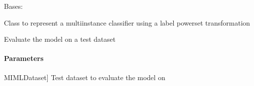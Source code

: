 \documentclass[letterpaper,10pt,english]{sphinxmanual}
\begin{document}
\begin{fulllineitems}
\label{\detokenize{classifier/mimlTOmi/_autosummary/miml.classifier.mimlTOmi.miml_to_mi_lp_classifier.MIMLtoMILPClassifier:miml.classifier.mimlTOmi.miml_to_mi_lp_classifier.MIMLtoMILPClassifier}}
\pysigstartsignatures
{}
\pysigstopsignatures
\sphinxAtStartPar
Bases: {\hyperref[\detokenize{classifier/mimlTOmi/_autosummary/miml.classifier.mimlTOmi.miml_to_mi_classifier.MIMLtoMIClassifier:miml.classifier.mimlTOmi.miml_to_mi_classifier.MIMLtoMIClassifier}]{}}

\sphinxAtStartPar
Class to represent a multi\sphinxhyphen{}instance classifier using a label powerset transformation

\begin{fulllineitems}
\label{\detokenize{classifier/mimlTOmi/_autosummary/miml.classifier.mimlTOmi.miml_to_mi_lp_classifier.MIMLtoMILPClassifier:miml.classifier.mimlTOmi.miml_to_mi_lp_classifier.MIMLtoMILPClassifier.evaluate}}
\pysigstartsignatures
{}
\pysigstopsignatures
\sphinxAtStartPar
Evaluate the model on a test dataset


\paragraph{Parameters}
\label{\detokenize{classifier/mimlTOmi/_autosummary/miml.classifier.mimlTOmi.miml_to_mi_lp_classifier.MIMLtoMILPClassifier:parameters}}\begin{description}
\sphinxlineitem{dataset\_test}{[}MIMLDataset{]}
\sphinxAtStartPar
Test dataset to evaluate the model on

\end{description}



\end{fulllineitems}
\end{fulllineitems}
\end{document}
